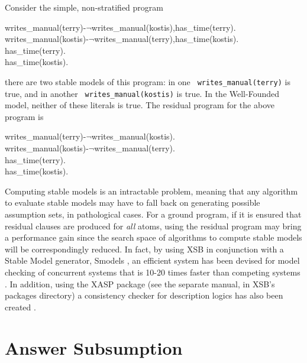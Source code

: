 \begin{example}
Consider the simple, non-stratified program
\begin{center}
\begin{Prog}
writes\_manual(terry)-$\neg$writes\_manual(kostis),has\_time(terry). \\
writes\_manual(kostis)-$\neg$writes\_manual(terry),has\_time(kostis). \\
has\_time(terry). \\
has\_time(kostis). \\
\end{Prog}
\end{center}
there are two stable models of this program: in one {\tt
writes\_manual(terry)} is true, and in another {\tt
writes\_manual(kostis)} is true.  In the Well-Founded model, neither
of these literals is true.  The residual program for the above program
is
\begin{center}
\begin{Prog}
writes\_manual(terry)-$\neg$writes\_manual(kostis). \\
writes\_manual(kostis)-$\neg$writes\_manual(terry). \\
has\_time(terry). \\
has\_time(kostis). \\
\end{Prog}
\end{center}
\end{example}

Computing stable models is an intractable problem, meaning that any
algorithm to evaluate stable models may have to fall back on
generating possible assumption sets, in pathological cases.  For a
ground program, if it is ensured that residual clauses are produced
for {\em all} atoms, using the residual program may bring a
performance gain since the search space of algorithms to compute
stable models will be correspondingly reduced.  In fact, by using XSB
in conjunction with a Stable Model generator, Smodels \cite{NiSi97},
an efficient system has been devised for model checking of concurrent
systems that is 10-20 times faster than competing systems
\cite{LiRS98}.  In addition, using the XASP package (see the separate
manual, \cite{CaSW02a} in XSB's packages directory) a consistency
checker for description logics has also been created \cite{Swif04}.


\section{Answer Subsumption}  \label{sec:table-aggregation}


